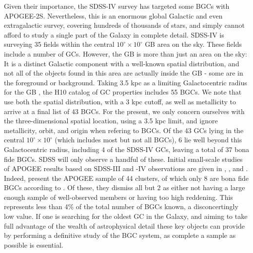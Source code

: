 \documentclass[onecolumn]{aa}
\begin{document}
Given their importance, the SDSS-IV survey has targeted some BGCs with APOGEE-2S. Nevertheless, this is an enormous global Galactic and even extragalactic survey, covering hundreds of thousands of stars, and simply cannot afford to study a single part of the Galaxy in complete detail.  SDSS-IV is surveying 35 fields within the  central $10^\circ \times 10^\circ$ GB area on the sky. These fields include a number of GCs. 
However, the GB is more than just an area on the sky:  It is a distinct Galactic component with a well-known spatial distribution, and not all of the objects found in this area  are actually inside the GB - some are in the foreground or background. Taking 3.5 kpc as a limiting Galactocentric radius for the GB \citep{Schultheis2017, Massari2019}, the H10 catalog of GC properties includes 55 BGCs. We note that \citet{Bica2016} use both the spatial distribution, with a 3 kpc cutoff, as well as metallicity to arrive at a final list of 43 BGCs. For the present, we only concern ourselves with the three-dimensional spatial location, using a 3.5 kpc limit,  and ignore metallicity, orbit, and origin when refering to BGCs. Of the 43 GCs lying in the central $10^\circ \times 10^\circ$ (which includes most but not all BGCs), 6 lie well beyond
this Galactocentric radius, including 4 of the SDSS-IV GCs, leaving a total of 37 bona fide BGCs.
SDSS will only observe a handful of these. Initial small-scale studies of APOGEE results based on SDSS-III and -IV observations are given in \citet{Schiavon2017}, \citet{Tang2017}, and \citet{Fernandez-Trincad2019}. Indeed, \citet{Meszaros2020} present the APOGEE sample of 44 clusters, of which only 8 are bona fide BGCs according to \cite{Massari2019}. 
Of these, they dismiss all but 2 as either not having a large enough sample of well-observed members or having too high reddening. This represents less than 4\% of the total number of BGCs known, a disconcertingly low value. If one is searching for the oldest GC in the Galaxy, and aiming to take full advantage of the wealth of astrophysical detail these key objects can provide by performing a definitive study of the  BGC system, as complete a sample as possible is essential.
\end{document}
